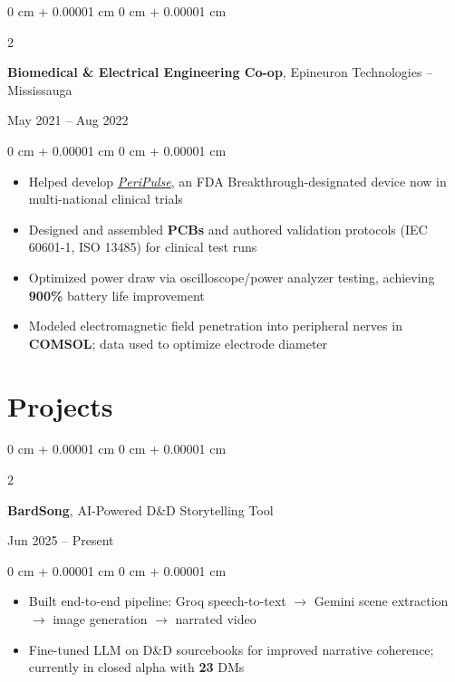 \documentclass[10pt, letterpaper]{article}
\newenvironment{highlights}{
    \begin{itemize}[
        topsep=0.10 cm,
        parsep=0.10 cm,
        partopsep=0pt,
        itemsep=0pt,
        leftmargin=0 cm + 10pt
    ]
}{
    \end{itemize}
} %
\newenvironment{onecolentry}{
    \begin{adjustwidth}{
        0 cm + 0.00001 cm
    }{
        0 cm + 0.00001 cm
    }
}{
    \end{adjustwidth}
} %
\newenvironment{twocolentry}[2][]{
    \onecolentry
    \def\secondColumn{#2}
    \setcolumnwidth{\fill, 4.5 cm}
    \begin{paracol}{2}
}{
    \switchcolumn \raggedleft \secondColumn
    \end{paracol}
    \endonecolentry
} %
\let\hrefWithoutArrow\href
\begin{document}
    \vspace{0.2 cm}
    \begin{twocolentry}{May 2021 – Aug 2022}
        \textbf{Biomedical \& Electrical Engineering Co-op}, Epineuron Technologies -- Mississauga
    \end{twocolentry}
    \vspace{0.10 cm}
    \begin{onecolentry}
        \begin{highlights}
            \item Helped develop \hrefWithoutArrow{https://www.epineurontech.com/peripulse}{\emph{\ul{PeriPulse}}}, an FDA Breakthrough-designated device now in multi-national clinical trials
            \item Designed and assembled \textbf{PCBs} and authored validation protocols (IEC 60601-1, ISO 13485) for clinical test runs
            \item Optimized power draw via oscilloscope/power analyzer testing, achieving \textbf{900\%} battery life improvement
            \item Modeled electromagnetic field penetration into peripheral nerves in \textbf{COMSOL}; data used to optimize electrode diameter
        \end{highlights}
    \end{onecolentry}

\section{Projects}
    \begin{twocolentry}{Jun 2025 – Present}
        \textbf{BardSong}, AI-Powered D\&D Storytelling Tool
    \end{twocolentry}
    \vspace{0.10 cm}
    \begin{onecolentry}
        \begin{highlights}
            \item Built end-to-end pipeline: Groq speech-to-text $\rightarrow$ Gemini scene extraction $\rightarrow$ image generation $\rightarrow$ narrated video
            \item Fine-tuned LLM on D\&D sourcebooks for improved narrative coherence; currently in closed alpha with \textbf{23} DMs
        \end{highlights}
    \end{onecolentry}
\end{document}

